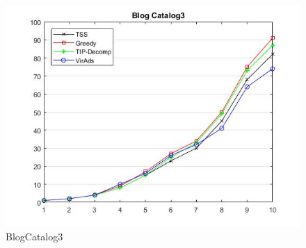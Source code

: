 \begin{figure}
	\centering
	\includegraphics[scale=0.5]{images/bc3result.jpg}
	\caption{BlogCatalog3}
	\end{figure}
	
